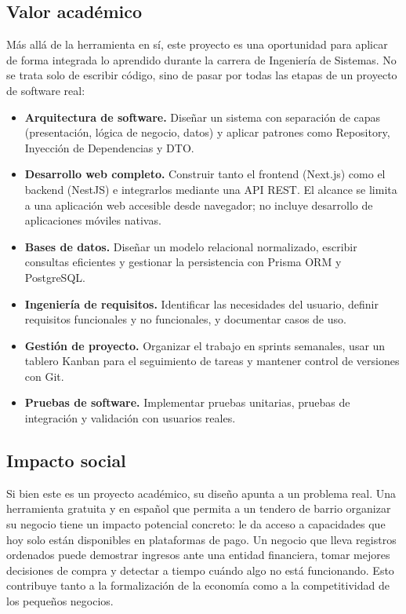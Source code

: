 \documentclass[spanish]{ieee_upb}
\begin{document}
\subsection{Valor académico}

Más allá de la herramienta en sí, este proyecto es una oportunidad para aplicar de forma integrada lo aprendido durante la carrera de Ingeniería de Sistemas. No se trata solo de escribir código, sino de pasar por todas las etapas de un proyecto de software real:

\begin{itemize}
	\item \textbf{Arquitectura de software.} Diseñar un sistema con separación de capas (presentación, lógica de negocio, datos) y aplicar patrones como Repository, Inyección de Dependencias y DTO.
	\item \textbf{Desarrollo web completo.} Construir tanto el frontend (Next.js) como el backend (NestJS) e integrarlos mediante una API REST. El alcance se limita a una aplicación web accesible desde navegador; no incluye desarrollo de aplicaciones móviles nativas.
	\item \textbf{Bases de datos.} Diseñar un modelo relacional normalizado, escribir consultas eficientes y gestionar la persistencia con Prisma ORM y PostgreSQL.
	\item \textbf{Ingeniería de requisitos.} Identificar las necesidades del usuario, definir requisitos funcionales y no funcionales, y documentar casos de uso.
	\item \textbf{Gestión de proyecto.} Organizar el trabajo en sprints semanales, usar un tablero Kanban para el seguimiento de tareas y mantener control de versiones con Git.
	\item \textbf{Pruebas de software.} Implementar pruebas unitarias, pruebas de integración y validación con usuarios reales.
\end{itemize}

\subsection{Impacto social}

Si bien este es un proyecto académico, su diseño apunta a un problema real. Una herramienta gratuita y en español que permita a un tendero de barrio organizar su negocio tiene un impacto potencial concreto: le da acceso a capacidades que hoy solo están disponibles en plataformas de pago. Un negocio que lleva registros ordenados puede demostrar ingresos ante una entidad financiera, tomar mejores decisiones de compra y detectar a tiempo cuándo algo no está funcionando. Esto contribuye tanto a la formalización de la economía como a la competitividad de los pequeños negocios.
\end{document}
